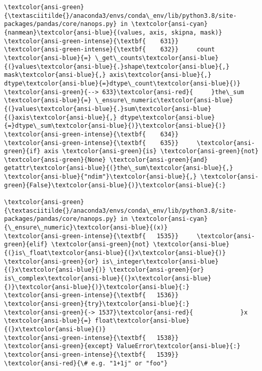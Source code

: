 \documentclass[11pt]{article}
\begin{document}
\begin{Verbatim}[commandchars=\\\{\}, frame=single, framerule=2mm, rulecolor=\color{outerrorbackground}]
\textcolor{ansi-green}{\textasciitilde{}/anaconda3/envs/conda\_env/lib/python3.8/site-packages/pandas/core/nanops.py} in \textcolor{ansi-cyan}{nanmean}\textcolor{ansi-blue}{(values, axis, skipna, mask)}
\textcolor{ansi-green-intense}{\textbf{    631}} 
\textcolor{ansi-green-intense}{\textbf{    632}}     count \textcolor{ansi-blue}{=} \_get\_counts\textcolor{ansi-blue}{(}values\textcolor{ansi-blue}{.}shape\textcolor{ansi-blue}{,} mask\textcolor{ansi-blue}{,} axis\textcolor{ansi-blue}{,} dtype\textcolor{ansi-blue}{=}dtype\_count\textcolor{ansi-blue}{)}
\textcolor{ansi-green}{--> 633}\textcolor{ansi-red}{     }the\_sum \textcolor{ansi-blue}{=} \_ensure\_numeric\textcolor{ansi-blue}{(}values\textcolor{ansi-blue}{.}sum\textcolor{ansi-blue}{(}axis\textcolor{ansi-blue}{,} dtype\textcolor{ansi-blue}{=}dtype\_sum\textcolor{ansi-blue}{)}\textcolor{ansi-blue}{)}
\textcolor{ansi-green-intense}{\textbf{    634}} 
\textcolor{ansi-green-intense}{\textbf{    635}}     \textcolor{ansi-green}{if} axis \textcolor{ansi-green}{is} \textcolor{ansi-green}{not} \textcolor{ansi-green}{None} \textcolor{ansi-green}{and} getattr\textcolor{ansi-blue}{(}the\_sum\textcolor{ansi-blue}{,} \textcolor{ansi-blue}{"ndim"}\textcolor{ansi-blue}{,} \textcolor{ansi-green}{False}\textcolor{ansi-blue}{)}\textcolor{ansi-blue}{:}

\textcolor{ansi-green}{\textasciitilde{}/anaconda3/envs/conda\_env/lib/python3.8/site-packages/pandas/core/nanops.py} in \textcolor{ansi-cyan}{\_ensure\_numeric}\textcolor{ansi-blue}{(x)}
\textcolor{ansi-green-intense}{\textbf{   1535}}     \textcolor{ansi-green}{elif} \textcolor{ansi-green}{not} \textcolor{ansi-blue}{(}is\_float\textcolor{ansi-blue}{(}x\textcolor{ansi-blue}{)} \textcolor{ansi-green}{or} is\_integer\textcolor{ansi-blue}{(}x\textcolor{ansi-blue}{)} \textcolor{ansi-green}{or} is\_complex\textcolor{ansi-blue}{(}x\textcolor{ansi-blue}{)}\textcolor{ansi-blue}{)}\textcolor{ansi-blue}{:}
\textcolor{ansi-green-intense}{\textbf{   1536}}         \textcolor{ansi-green}{try}\textcolor{ansi-blue}{:}
\textcolor{ansi-green}{-> 1537}\textcolor{ansi-red}{             }x \textcolor{ansi-blue}{=} float\textcolor{ansi-blue}{(}x\textcolor{ansi-blue}{)}
\textcolor{ansi-green-intense}{\textbf{   1538}}         \textcolor{ansi-green}{except} ValueError\textcolor{ansi-blue}{:}
\textcolor{ansi-green-intense}{\textbf{   1539}}             \textcolor{ansi-red}{\# e.g. "1+1j" or "foo"}


\end{Verbatim}
\end{document}
